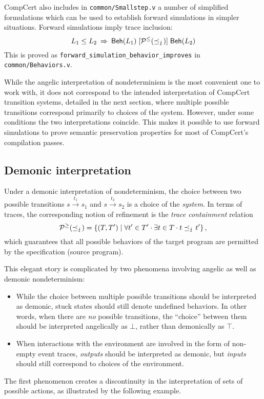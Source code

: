 \documentclass[acmsmall,review,anonymous]{acmart}\settopmatter{printfolios=true,printccs=false,printacmref=false}
\newcommand{\bdot}{\cdot}
\begin{document}
CompCert also includes in \texttt{common/Smallstep.v}
a number of simplified formulations
which can be used to establish forward simulations
in simpler situations.
Forward simulations imply trace inclusion:
\[
  L_1 \le L_2
  \: \Rightarrow \:
   \mathsf{Beh} (L_1) \mathrel{[{\mathcal{P}^\le(\preceq_\lightning)}]}  \mathsf{Beh} (L_2)
\]
This is proved as \texttt{forward\_simulation\_behavior\_improves}
in \texttt{common/Behaviors.v}.

While the angelic interpretation
of nondeterminism is the most convenient one to work with,
it does not correspond to the intended interpretation
of CompCert transition systems,
detailed in the next section,
where multiple possible transitions correspond
primarily to choices of the system.
However,
under some conditions
the two interpretations coincide.
This makes it possible to use forward simulations
to prove semantic preservation properties
for most of CompCert's compilation passes.


\subsection{Demonic interpretation} %

Under a demonic interpretation of nondeterminism,
the choice between two possible transitions
$s \stackrel{t_1}{\longrightarrow} s_1$ and
$s \stackrel{t_2}{\longrightarrow} s_2$
is a choice of the \emph{system}.
In terms of traces,
the corresponding notion of refinement
is the \emph{trace containment} relation
\[
  \mathcal{P}^\ge({\refby_\lightning}) =
  \{ (T, T') \mid \forall t' \in T' \bdot \exists t \in T \bdot
    t \refby_\lightning t' \}
  \,,
\]
which guarantees that all possible behaviors of the target program
are permitted by the specification (source program).

This elegant story is complicated by two phenomena
involving angelic as well as demonic nondeterminism:
\begin{itemize}
  \item
    While the choice between multiple possible transitions
    should be interpreted as demonic,
    stuck states should still denote undefined behaviors.
    In other words,
    when there are \emph{no} possible transitions,
    the ``choice'' between them should be interpreted
    angelically as $\bot$,
    rather than demonically as $\top$.
  \item
    When interactions with the environment are involved
    in the form of non-empty event traces,
    \emph{outputs} should be interpreted as demonic,
    but \emph{inputs} should still correspond to
    choices of the environment.
\end{itemize}
The first phenomenon creates a discontinuity
in the interpretation of sets of possible actions,
as illustrated by the following example.
\end{document}
